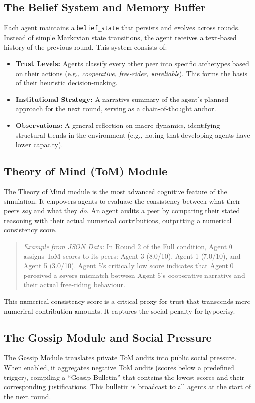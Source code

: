 \documentclass[11pt,a4paper]{article}
\begin{document}
\subsection{The Belief System and Memory Buffer}
Each agent maintains a \texttt{belief\_state} that persists and evolves across rounds. Instead of simple Markovian state transitions, the agent receives a text-based history of the previous round. This system consists of:
\begin{itemize}
    \item \textbf{Trust Levels:} Agents classify every other peer into specific archetypes based on their actions (e.g., \textit{cooperative}, \textit{free-rider}, \textit{unreliable}). This forms the basis of their heuristic decision-making.
    \item \textbf{Institutional Strategy:} A narrative summary of the agent's planned approach for the next round, serving as a chain-of-thought anchor.
    \item \textbf{Observations:} A general reflection on macro-dynamics, identifying structural trends in the environment (e.g., noting that developing agents have lower capacity).
\end{itemize}

\subsection{Theory of Mind (ToM) Module}
The Theory of Mind module is the most advanced cognitive feature of the simulation. It empowers agents to evaluate the consistency between what their peers \textit{say} and what they \textit{do}. An agent audits a peer by comparing their stated reasoning with their actual numerical contributions, outputting a numerical consistency score.
\begin{quote}
\textit{Example from JSON Data:} In Round 2 of the Full condition, Agent 0 assigns ToM scores to its peers: Agent 3 (8.0/10), Agent 1 (7.0/10), and Agent 5 (3.0/10). Agent 5's critically low score indicates that Agent 0 perceived a severe mismatch between Agent 5's cooperative narrative and their actual free-riding behaviour.
\end{quote}
This numerical consistency score is a critical proxy for trust that transcends mere numerical contribution amounts. It captures the social penalty for hypocrisy.

\subsection{The Gossip Module and Social Pressure}
The Gossip Module translates private ToM audits into public social pressure. When enabled, it aggregates negative ToM audits (scores below a predefined trigger), compiling a ``Gossip Bulletin'' that contains the lowest scores and their corresponding justifications. This bulletin is broadcast to all agents at the start of the next round. 
\end{document}
